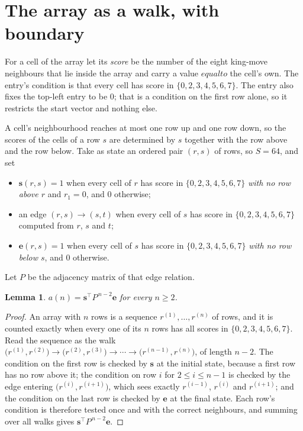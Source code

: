 \documentclass[11pt,a4paper]{article}
\theoremstyle{plain}
\newtheorem{lemma}[theorem]{Lemma}
\theoremstyle{definition}
\begin{document}
\section{The array as a walk, with boundary}

For a cell of the array let its \emph{score} be the number of the eight king-move neighbours that lie inside
the array and carry a value $equal to$ the cell's own. The entry's condition is that every cell
has score in $\{0,2,3,4,5,6,7\}$. The entry also fixes the top-left entry to be $0$; that is a condition on the first row alone, so it restricts the start vector and nothing else.

A cell's neighbourhood reaches at most one row up and one row down, so the scores of the
cells of a row $s$ are determined by $s$ together with the row above and the row below.
Take as state an ordered pair $(r,s)$ of rows, so $S=64$, and set
\begin{itemize}
\item $\mathbf{s}(r,s)=1$ when every cell of $r$ has score in $\{0,2,3,4,5,6,7\}$ \emph{with no row
above $r$} and $r_1=0$, and $0$ otherwise;
\item an edge $(r,s)\to(s,t)$ when every cell of $s$ has score in $\{0,2,3,4,5,6,7\}$ computed from
$r$, $s$ and $t$;
\item $\mathbf{e}(r,s)=1$ when every cell of $s$ has score in $\{0,2,3,4,5,6,7\}$ \emph{with no row
below $s$}, and $0$ otherwise.
\end{itemize}
Let $P$ be the adjacency matrix of that edge relation.

\begin{lemma}\label{lem:walk}
$a(n)=\mathbf{s}^{\!\top}P^{\,n-2}\mathbf{e}$ for every $n\ge2$.
\end{lemma}

\begin{proof}
An array with $n$ rows is a sequence $r^{(1)},\dots,r^{(n)}$ of rows, and it is counted
exactly when every one of its $n$ rows has all scores in $\{0,2,3,4,5,6,7\}$. Read the sequence as the
walk $\bigl(r^{(1)},r^{(2)}\bigr)\to\bigl(r^{(2)},r^{(3)}\bigr)\to\cdots\to
\bigl(r^{(n-1)},r^{(n)}\bigr)$, of length $n-2$. The condition on the first row is
checked by $\mathbf{s}$ at the initial state, because a first row has no row above it; the
condition on row $i$ for $2\le i\le n-1$ is checked by the edge entering
$\bigl(r^{(i)},r^{(i+1)}\bigr)$, which sees exactly $r^{(i-1)}$, $r^{(i)}$ and
$r^{(i+1)}$; and the condition on the last row is checked by $\mathbf{e}$ at the final
state. Each row's condition is therefore tested once and with the correct neighbours, and
summing over all walks gives $\mathbf{s}^{\!\top}P^{\,n-2}\mathbf{e}$.
\end{proof}
\end{document}
